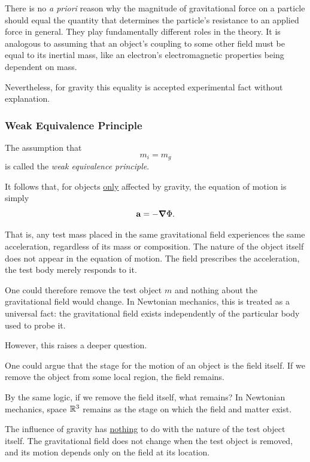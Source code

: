 		There is no \textit{a priori} reason why the magnitude of gravitational force on a particle should equal the quantity that determines the particle's resistance to an applied force in general. 
		They play fundamentally different roles in the theory. It is 
		analogous to assuming that an object's coupling to some other field must be equal to 
		its inertial mass, like an electron's electromagnetic properties being dependent on mass.

		Nevertheless, for gravity this equality is accepted experimental fact without explanation. 
	

	\subsubsection{Weak Equivalence Principle}
		The assumption that
		\begin{equation}
			m_i=m_g
		\end{equation}
		is called the \textit{weak equivalence principle}.

		It follows that, for objects \underline{only} affected by gravity, the equation of motion is simply
		\begin{equation}
			\vb{a} = -\grad\Phi.
		\end{equation}

		That is, any test mass placed in the same gravitational field experiences the same acceleration, regardless of its mass or composition. The nature of the object itself does not appear in the equation of motion. The field prescribes the acceleration, the test body merely responds to it.

		One could therefore remove the test object $m$ and nothing about the gravitational field would change. In Newtonian mechanics, this is treated as a universal fact: the gravitational field exists independently of the particular body used to probe it.

		However, this raises a deeper question.

		One could argue that the stage for the motion of an object is the field itself. If we remove the object from some local region, the field remains.

		By the same logic, if we remove the field itself, what remains? In Newtonian mechanics, space $\mathbb{R}^3$ remains as the stage on which the field and matter exist.

		The influence of gravity has \underline{nothing} to do with the nature of the test object itself. The gravitational field does not change when the test object is removed, and its motion depends only on the field at its location.


